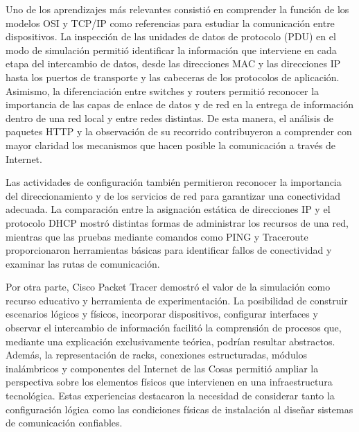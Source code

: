 Uno de los aprendizajes más relevantes consistió en comprender la función de los modelos OSI y TCP/IP como referencias para estudiar la comunicación entre dispositivos. La inspección de las unidades de datos de protocolo (PDU) en el modo de simulación permitió identificar la información que interviene en cada etapa del intercambio de datos, desde las direcciones MAC y las direcciones IP hasta los puertos de transporte y las cabeceras de los protocolos de aplicación. Asimismo, la diferenciación entre switches y routers permitió reconocer la importancia de las capas de enlace de datos y de red en la entrega de información dentro de una red local y entre redes distintas. De esta manera, el análisis de paquetes HTTP y la observación de su recorrido contribuyeron a comprender con mayor claridad los mecanismos que hacen posible la comunicación a través de Internet.

Las actividades de configuración también permitieron reconocer la importancia del direccionamiento y de los servicios de red para garantizar una conectividad adecuada. La comparación entre la asignación estática de direcciones IP y el protocolo DHCP mostró distintas formas de administrar los recursos de una red, mientras que las pruebas mediante comandos como PING y Traceroute proporcionaron herramientas básicas para identificar fallos de conectividad y examinar las rutas de comunicación.

Por otra parte, Cisco Packet Tracer demostró el valor de la simulación como recurso educativo y herramienta de experimentación. La posibilidad de construir escenarios lógicos y físicos, incorporar dispositivos, configurar interfaces y observar el intercambio de información facilitó la comprensión de procesos que, mediante una explicación exclusivamente teórica, podrían resultar abstractos. Además, la representación de racks, conexiones estructuradas, módulos inalámbricos y componentes del Internet de las Cosas permitió ampliar la perspectiva sobre los elementos físicos que intervienen en una infraestructura tecnológica. Estas experiencias destacaron la necesidad de considerar tanto la configuración lógica como las condiciones físicas de instalación al diseñar sistemas de comunicación confiables.

